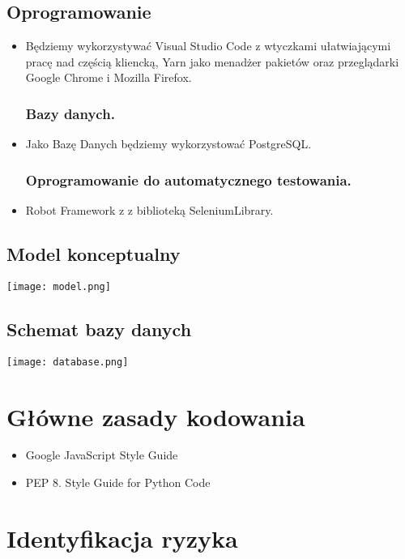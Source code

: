 \documentclass[12pt]{article}
\begin{document}
\subsection{Oprogramowanie}
\begin{itemize}
	\subsubsection{Narzędzia programistyczne}
    	\item  Będziemy wykorzystywać Visual Studio Code z wtyczkami ułatwiającymi pracę nad
		częścią kliencką, Yarn jako menadżer pakietów oraz przeglądarki Google Chrome i Mozilla
		Firefox.
        
	\subsubsection{Bazy danych.}
    	\item Jako Bazę Danych będziemy wykorzystować PostgreSQL.
	\subsubsection {Oprogramowanie do automatycznego testowania.}
    	\item Robot Framework z z biblioteką SeleniumLibrary.
\end{itemize}


\subsection{Model konceptualny}

\texttt{[image: model.png]}


\subsection{Schemat bazy danych}
\texttt{[image: database.png]}
	
\section{Główne zasady kodowania}
\begin{itemize}
	\item Google JavaScript Style Guide
	\item PEP 8. Style Guide for Python Code
\end{itemize}


\section{Identyfikacja ryzyka}
\end{document}
